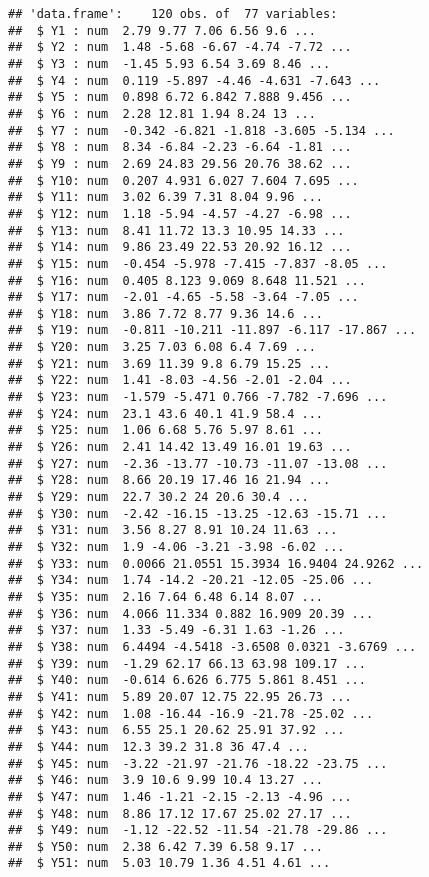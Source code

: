 \documentclass[
]{article}
\begin{document}
\begin{verbatim}
## 'data.frame':    120 obs. of  77 variables:
##  $ Y1 : num  2.79 9.77 7.06 6.56 9.6 ...
##  $ Y2 : num  1.48 -5.68 -6.67 -4.74 -7.72 ...
##  $ Y3 : num  -1.45 5.93 6.54 3.69 8.46 ...
##  $ Y4 : num  0.119 -5.897 -4.46 -4.631 -7.643 ...
##  $ Y5 : num  0.898 6.72 6.842 7.888 9.456 ...
##  $ Y6 : num  2.28 12.81 1.94 8.24 13 ...
##  $ Y7 : num  -0.342 -6.821 -1.818 -3.605 -5.134 ...
##  $ Y8 : num  8.34 -6.84 -2.23 -6.64 -1.81 ...
##  $ Y9 : num  2.69 24.83 29.56 20.76 38.62 ...
##  $ Y10: num  0.207 4.931 6.027 7.604 7.695 ...
##  $ Y11: num  3.02 6.39 7.31 8.04 9.96 ...
##  $ Y12: num  1.18 -5.94 -4.57 -4.27 -6.98 ...
##  $ Y13: num  8.41 11.72 13.3 10.95 14.33 ...
##  $ Y14: num  9.86 23.49 22.53 20.92 16.12 ...
##  $ Y15: num  -0.454 -5.978 -7.415 -7.837 -8.05 ...
##  $ Y16: num  0.405 8.123 9.069 8.648 11.521 ...
##  $ Y17: num  -2.01 -4.65 -5.58 -3.64 -7.05 ...
##  $ Y18: num  3.86 7.72 8.77 9.36 14.6 ...
##  $ Y19: num  -0.811 -10.211 -11.897 -6.117 -17.867 ...
##  $ Y20: num  3.25 7.03 6.08 6.4 7.69 ...
##  $ Y21: num  3.69 11.39 9.8 6.79 15.25 ...
##  $ Y22: num  1.41 -8.03 -4.56 -2.01 -2.04 ...
##  $ Y23: num  -1.579 -5.471 0.766 -7.782 -7.696 ...
##  $ Y24: num  23.1 43.6 40.1 41.9 58.4 ...
##  $ Y25: num  1.06 6.68 5.76 5.97 8.61 ...
##  $ Y26: num  2.41 14.42 13.49 16.01 19.63 ...
##  $ Y27: num  -2.36 -13.77 -10.73 -11.07 -13.08 ...
##  $ Y28: num  8.66 20.19 17.46 16 21.94 ...
##  $ Y29: num  22.7 30.2 24 20.6 30.4 ...
##  $ Y30: num  -2.42 -16.15 -13.25 -12.63 -15.71 ...
##  $ Y31: num  3.56 8.27 8.91 10.24 11.63 ...
##  $ Y32: num  1.9 -4.06 -3.21 -3.98 -6.02 ...
##  $ Y33: num  0.0066 21.0551 15.3934 16.9404 24.9262 ...
##  $ Y34: num  1.74 -14.2 -20.21 -12.05 -25.06 ...
##  $ Y35: num  2.16 7.64 6.48 6.14 8.07 ...
##  $ Y36: num  4.066 11.334 0.882 16.909 20.39 ...
##  $ Y37: num  1.33 -5.49 -6.31 1.63 -1.26 ...
##  $ Y38: num  6.4494 -4.5418 -3.6508 0.0321 -3.6769 ...
##  $ Y39: num  -1.29 62.17 66.13 63.98 109.17 ...
##  $ Y40: num  -0.614 6.626 6.775 5.861 8.451 ...
##  $ Y41: num  5.89 20.07 12.75 22.95 26.73 ...
##  $ Y42: num  1.08 -16.44 -16.9 -21.78 -25.02 ...
##  $ Y43: num  6.55 25.1 20.62 25.91 37.92 ...
##  $ Y44: num  12.3 39.2 31.8 36 47.4 ...
##  $ Y45: num  -3.22 -21.97 -21.76 -18.22 -23.75 ...
##  $ Y46: num  3.9 10.6 9.99 10.4 13.27 ...
##  $ Y47: num  1.46 -1.21 -2.15 -2.13 -4.96 ...
##  $ Y48: num  8.86 17.12 17.67 25.02 27.17 ...
##  $ Y49: num  -1.12 -22.52 -11.54 -21.78 -29.86 ...
##  $ Y50: num  2.38 6.42 7.39 6.58 9.17 ...
##  $ Y51: num  5.03 10.79 1.36 4.51 4.61 ...

\end{verbatim}
\end{document}
